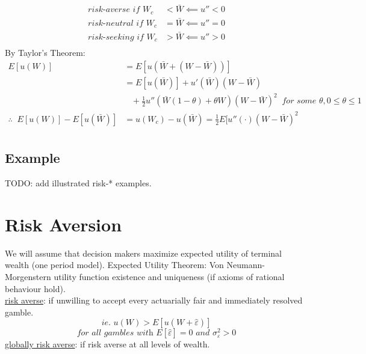 \documentclass[
14pt,notheorems,hyperref={pdfauthor=whatever}
]{beamer}
\begin{document}
\begin{frame}
\begin{align*}
    \textit{risk-averse if } W_c &< \bar{W} \impliedby u''<0\\
    \textit{risk-neutral if } W_c &= \bar{W} \impliedby u''=0\\
    \textit{risk-seeking if } W_c &> \bar{W} \impliedby u''>0\\
\end{align*}
By Taylor's Theorem:
\begin{align*}
    E[u(W)] &= E[u(\bar{W}+(W-\bar{W}))]\\
    &= E[u(\bar{W})]+u'(\bar{W})(W-\bar{W})\\
    &\;\;\;+\frac{1}{2}u''(\bar{W}(1-\theta)+\theta W)(W-\bar{W})^2\;\;\textit{for some }\theta, 0 \leq \theta \leq 1\\
    \therefore \;\; E[u(W)]-E[u(\bar{W})] &= u(W_c)-u(\bar{W}) = \frac{1}{2}E[u''(\cdot)(W-\bar{W})^2\\
\end{align*}
\end{frame}

\subsection{Example}

\begin{frame}
TODO: add illustrated risk-* examples.
\end{frame}

\section{Risk Aversion}
\begin{frame}
We will assume that decision makers maximize expected utility of terminal wealth (one period model). Expected Utility Theorem: Von Neumann-Morgenstern utility function existence and uniqueness (if axioms of rational behaviour hold).\\
\hfill \break
\underline{risk averse}: if unwilling to accept every actuarially fair and immediately resolved gamble.\\
\[\textit{ie. } u(W) > E[u(W+\hat{\varepsilon})]\]
\[\textit{for all gambles with $E[\hat{\varepsilon}]=0$ and $\sigma_\varepsilon^2 >0$}\]
\hfill \break
\underline{globally risk averse}: if risk averse at all levels of wealth.\\
\end{frame}
\end{document}
